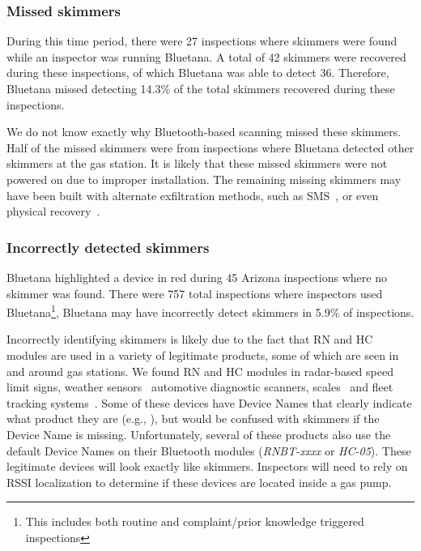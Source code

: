 \subsubsection*{Missed skimmers}
\label{sec:falsenegative}


During this time period, there were 27 inspections where
skimmers were found while an inspector was running Bluetana.
%
A total of 42 skimmers were
recovered during these inspections, of which Bluetana was able to detect 36.
%
Therefore, Bluetana missed detecting 14.3\% of the total skimmers recovered during these inspections.

We do not know exactly why Bluetooth-based scanning missed these skimmers.
%
Half of the missed skimmers were from inspections where Bluetana detected other
skimmers at the gas station.
%
It is likely that these missed skimmers were not powered on due to
improper installation.
%
The remaining missing skimmers may have been built with alternate
exfiltration methods, such as SMS~\cite{scaifeoakland}, or even physical
recovery~\cite{skimreaper2018}.

%
	

\subsubsection*{Incorrectly detected skimmers}
\label{sec:falsepositive}

Bluetana highlighted a device in red during 45 Arizona inspections where no
skimmer was found.
%
There were 757 total inspections where inspectors used
Bluetana\footnote{This includes both routine and complaint/prior knowledge
triggered inspections},  Bluetana may have incorrectly detect skimmers in 5.9\%
of inspections.


Incorrectly identifying skimmers is likely due to the fact that  RN and HC
modules are used in a variety of legitimate products, some of which are seen in
and around gas stations.
%
We found RN and HC modules in radar-based speed limit signs, weather
sensors~\cite{rnbtweathersensor} automotive diagnostic scanners,
scales~\cite{rnbtscale} and fleet tracking systems~\cite{rnbteletrac}.
%
Some of these devices have Device Names that clearly indicate what product they
are (e.g., \texttt{}), but would be confused with skimmers if the Device Name
is missing.
%
Unfortunately, several of these products also use the default Device Names on
their Bluetooth modules (\emph{RNBT-xxxx} or \emph{HC-05}).
%
These legitimate devices will look exactly like skimmers.
%
Inspectors will need to rely on RSSI localization to determine if these devices
are located inside a gas pump.

